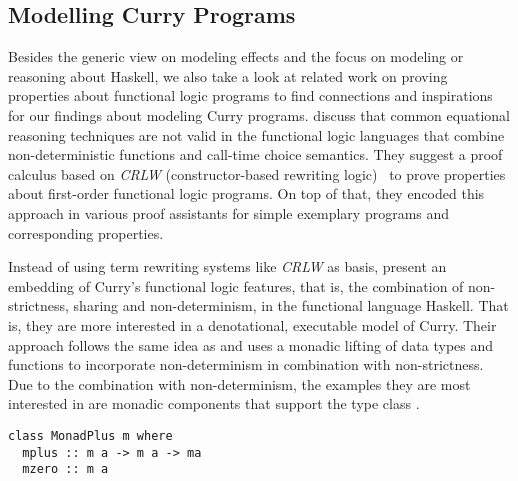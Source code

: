 \subsection{Modelling Curry Programs}

Besides the generic view on modeling effects and the focus on modeling or reasoning about Haskell, we also take a look at related work on proving properties about functional logic programs to find connections and inspirations for our findings about modeling Curry programs.
\citet{cleva2004logic} discuss that common equational reasoning techniques are not valid in the functional logic languages that combine non-deterministic functions and call-time choice semantics.
They suggest a proof calculus based on \emph{CRLW} (constructor-based rewriting logic)~\citep{gonzalez1996rewriting} to prove properties about first-order functional logic programs.
On top of that, they encoded this approach in various proof assistants for simple exemplary programs and corresponding properties.

Instead of using term rewriting systems like \emph{CRLW} as basis, \citet{fischer2009purely} present an embedding of Curry's functional logic features, that is, the combination of non-strictness, sharing and non-determinism, in the functional language Haskell.
That is, they are more interested in a denotational, executable model of Curry.
Their approach follows the same idea as \citet{abel2005verifying} and uses a monadic lifting of data types and functions to incorporate non-determinism in combination with non-strictness.
Due to the combination with non-determinism, the examples they are most interested in are monadic components that support the type class .

\begin{verbatim}
class MonadPlus m where
  mplus :: m a -> m a -> ma
  mzero :: m a
\end{verbatim}


